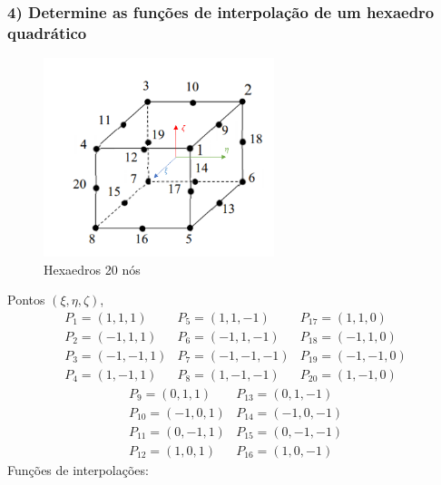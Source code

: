 \subsubsection{4) Determine as funções de interpolação de um hexaedro quadrático}
%
\begin{figure}[H]
		\includegraphics[width=0.6\textwidth,center]{fig/hexaedro_20.PNG}
		\caption{Hexaedros 20 nós} 
\end{figure}
%
Pontos $(\xi,\eta,\zeta)$,
%
\begin{equation*}
		\begin{matrix}
		P_1 = ( 1, 1, 1)	& P_5 = ( 1, 1,-1)&P_{17} = ( 1, 1,0)\\ 
		P_2 = (-1, 1, 1)	& P_6 = (-1, 1,-1)&P_{18} = (-1, 1,0)\\
		P_3 = (-1,-1, 1)    & P_7 = (-1,-1,-1)&P_{19} = (-1,-1,0)\\ 
		P_4 = ( 1,-1, 1)    & P_8 = ( 1,-1,-1)&P_{20} = ( 1,-1,0)
		\end{matrix}
\end{equation*}
%
\begin{equation*}
	\begin{matrix}
	P_9    = (  0, 1, 1) &P_{13} = ( 0, 1, -1)\\
	P_{10} = ( -1, 0, 1) &P_{14} = (-1, 0, -1)\\
	P_{11} = (  0,-1, 1) &P_{15} = ( 0,-1, -1)\\
	P_{12} = (  1, 0, 1) &P_{16} = ( 1, 0, -1)
	\end{matrix}
\end{equation*}
%
Funções de interpolações:
%
